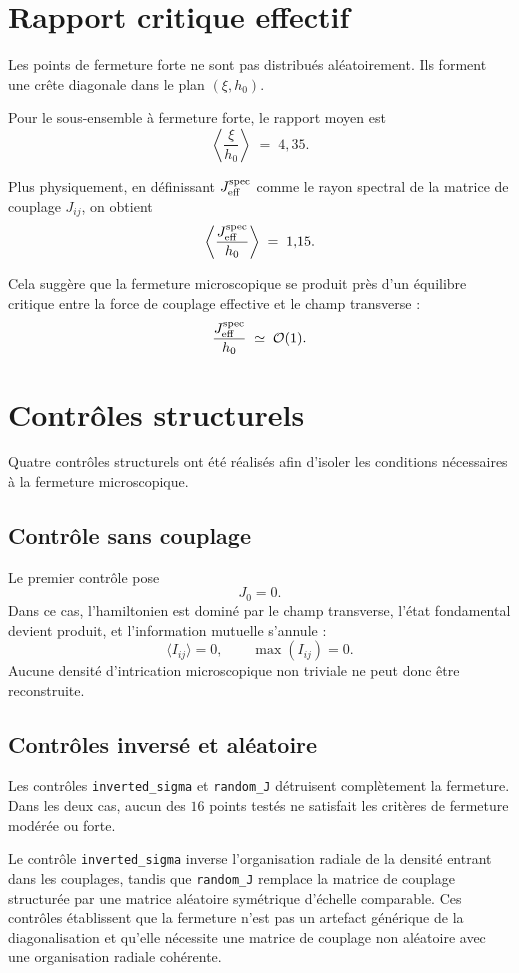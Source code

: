 \documentclass[11pt]{article}
\begin{document}
\section{Rapport critique effectif}

Les points de fermeture forte ne sont pas distribués aléatoirement. Ils forment une crête diagonale dans le plan \((\xi, h_0)\).

Pour le sous-ensemble à fermeture forte, le rapport moyen est
\[
\left\langle
\frac{\xi}{h_0}
\right\rangle
\;=\;
4{,}35.
\]

Plus physiquement, en définissant \(J_{\rm eff}^{\rm spec}\) comme le rayon spectral de la matrice de couplage \(J_{ij}\), on obtient
\[
\left\langle
\frac{J_{\rm eff}^{\rm spec}}{h_0}
\right\rangle
\;=\;
1{,}15.
\]

Cela suggère que la fermeture microscopique se produit près d'un équilibre critique entre la force de couplage effective et le champ transverse :
\[
\frac{J_{\rm eff}^{\rm spec}}{h_0}
\;\simeq\;
\mathcal{O}(1).
\]

\section{Contrôles structurels}

Quatre contrôles structurels ont été réalisés afin d'isoler les conditions nécessaires à la fermeture microscopique.

\subsection{Contrôle sans couplage}

Le premier contrôle pose
\[
J_0 = 0.
\]
Dans ce cas, l'hamiltonien est dominé par le champ transverse, l'état fondamental devient produit, et l'information mutuelle s'annule :
\[
\langle I_{ij} \rangle = 0,
\qquad
\max(I_{ij}) = 0.
\]
Aucune densité d'intrication microscopique non triviale ne peut donc être reconstruite.

\subsection{Contrôles inversé et aléatoire}

Les contrôles \texttt{inverted\_sigma} et \texttt{random\_J} détruisent complètement la fermeture. Dans les deux cas, aucun des \(16\) points testés ne satisfait les critères de fermeture modérée ou forte.

Le contrôle \texttt{inverted\_sigma} inverse l'organisation radiale de la densité entrant dans les couplages, tandis que \texttt{random\_J} remplace la matrice de couplage structurée par une matrice aléatoire symétrique d'échelle comparable. Ces contrôles établissent que la fermeture n'est pas un artefact générique de la diagonalisation et qu'elle nécessite une matrice de couplage non aléatoire avec une organisation radiale cohérente.
\end{document}
